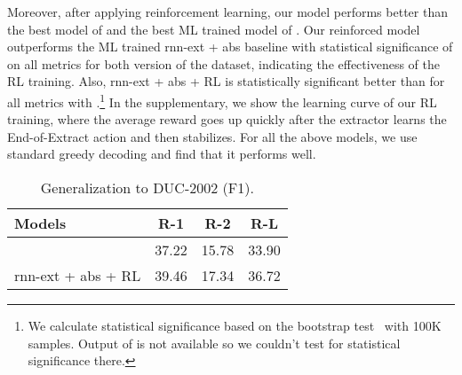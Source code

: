 \documentclass[11pt,a4paper]{article}
\begin{document}
Moreover, after applying reinforcement learning, our model performs better than the best model of \citet{get_to_the_point} and the best ML trained model of \citet{DBLP:journals/corr/PaulusXS17}.
Our reinforced model outperforms the ML trained rnn-ext + abs baseline with statistical significance of  on all metrics for both version of the dataset, indicating the effectiveness of the RL training.
Also, rnn-ext + abs + RL is statistically significant better than \citet{get_to_the_point} for all metrics with .\footnote{We calculate statistical significance based on the bootstrap test~\cite{noreen1989computer,efron1994introduction} with 100K samples. Output of \citet{DBLP:journals/corr/PaulusXS17} is not available so we couldn't test for statistical significance there.}
In the supplementary, we show the learning curve of our RL training, where the average reward goes up quickly after the extractor learns the End-of-Extract action and then stabilizes.
For all the above models, we use standard greedy decoding and find that it performs well.


\begin{table}[t]
\begin{small}
\centering
\begin{tabular}{ | l | c  c  c |}
  \hline
  Models & R-1 & R-2 & R-L \\
  \hline
  \citet{get_to_the_point} & 37.22 & 15.78 & 33.90 \\
  rnn-ext + abs + RL  & 39.46 & 17.34 & 36.72 \\ \hline
\end{tabular}
\vspace{-8pt}
\caption{Generalization to DUC-2002 (F1). }
\vspace{-12pt}
\label{tab:duc}
\end{small}
\end{table}
\end{document}
